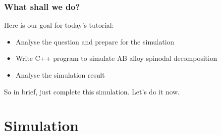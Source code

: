 \documentclass[compress,xcolor={dvipsnames}]{beamer}
\begin{document}
\begin{frame}
    \frametitle{What shall we do?}

    Here is our goal for today's tutorial:
    \begin{itemize}
        \item Analyse the question and prepare for the simulation
        \item Write C++ program to simulate AB alloy spinodal decomposition
        \item Analyse the simulation result
    \end{itemize}

    So in brief, just complete this simulation. Let's do it now.

\end{frame}

\section{Simulation}
\end{document}

